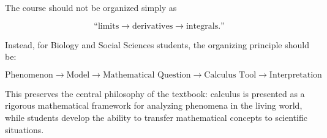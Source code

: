 \documentclass[11pt]{article}
\begin{document}
The course should not be organized simply as

\[
\text{``limits} \rightarrow \text{derivatives} \rightarrow
\text{integrals.''}
\]

Instead, for Biology and Social Sciences students, the organizing principle
should be:

\[
\boxed{
\text{Phenomenon}
\rightarrow
\text{Model}
\rightarrow
\text{Mathematical Question}
\rightarrow
\text{Calculus Tool}
\rightarrow
\text{Interpretation}
}
\]

This preserves the central philosophy of the textbook: calculus is presented
as a rigorous mathematical framework for analyzing phenomena in the living
world, while students develop the ability to transfer mathematical concepts
to scientific situations.
\end{document}
